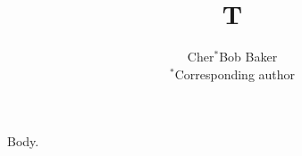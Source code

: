 \documentclass{article}
\begin{document}
\title{T}
\author{Cher$^*$Bob Baker\\ $^*$Corresponding author}
\maketitle
Body.
\end{document}
